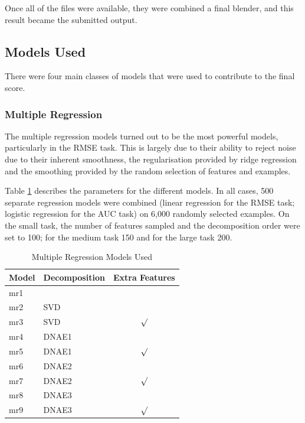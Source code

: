 \documentclass{article}
\begin{document}
Once all of the files were available, they were combined a final blender, and this result became the submitted output.

\subsection{Models Used}

There were four main classes of models that were used to contribute to the final score.

\subsubsection{Multiple Regression}

The multiple regression models turned out to be the most powerful models, particularly in the RMSE task.  This is largely due to their ability to reject noise due to their inherent smoothness, the regularisation provided by ridge regression and the smoothing provided by the random selection of features and examples.

Table \ref{table:multiple-regression-models} describes the parameters for the different models.  In all cases, 500 separate regression models were combined (linear regression for the RMSE task; logistic regression for the AUC task) on 6,000 randomly selected examples.  On the small task, the number of features sampled and the decomposition order were set to 100; for the medium task 150 and for the large task 200.

\begin{table}
\caption{Multiple Regression Models Used}
\label{table:multiple-regression-models}
\vskip 0.15in
\begin{center}
\begin{small}
\begin{sc}
\begin{tabular}{llc}
\hline
\abovespace\belowspace
Model & Decomposition & Extra Features \\
\hline
\abovespace
mr1   &        &         \\
mr2   & SVD    &         \\
mr3   & SVD    & $\surd$ \\
mr4   & DNAE1  &         \\
mr5   & DNAE1  & $\surd$ \\
mr6   & DNAE2  &         \\
mr7   & DNAE2  & $\surd$ \\
mr8   & DNAE3  &         \\
\belowspace
mr9   & DNAE3  & $\surd$ \\
\hline
\end{tabular}
\end{sc}
\end{small}
\end{center}
\vskip -0.1in
\end{table}
\end{document}
